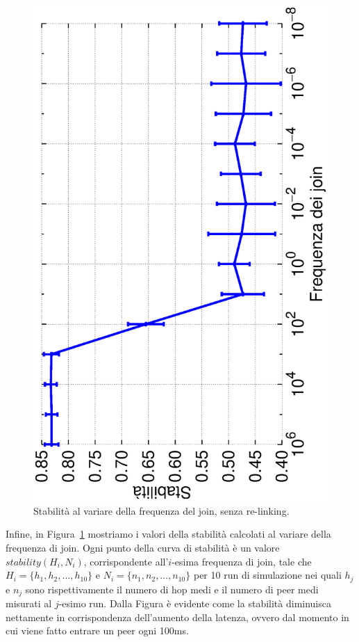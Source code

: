 \documentclass[prodmode,acmtap]{acmlarge}
\begin{document}
\begin{figure}	
\centering
	\includegraphics[scale=.35, angle=-90]{imgs/norelink-freq-stability.eps}
\caption{Stabilità al variare della frequenza del join, senza re-linking.}
\label{img:stabilita2}
\end{figure}

Infine, in Figura~\ref{img:stabilita2} mostriamo i valori della stabilità calcolati al variare della frequenza di join. Ogni punto della curva di stabilità è un valore $stability(H_i,N_i)$, corrispondente all'$i$-esima frequenza di join, tale che $H_i = \{ h_1, h_2, \dots, h_{10} \}$ e $N_i = \{ n_1, n_2, \dots, n_{10} \}$ per 10 run di simulazione nei quali $h_j$ e $n_j$ sono rispettivamente il numero di hop medi e il numero di peer medi misurati al $j$-esimo run.
Dalla Figura è evidente come la stabilità diminuisca nettamente in corrispondenza dell'aumento della latenza, ovvero dal momento in cui viene fatto entrare un peer ogni 100ms.
\end{document}
